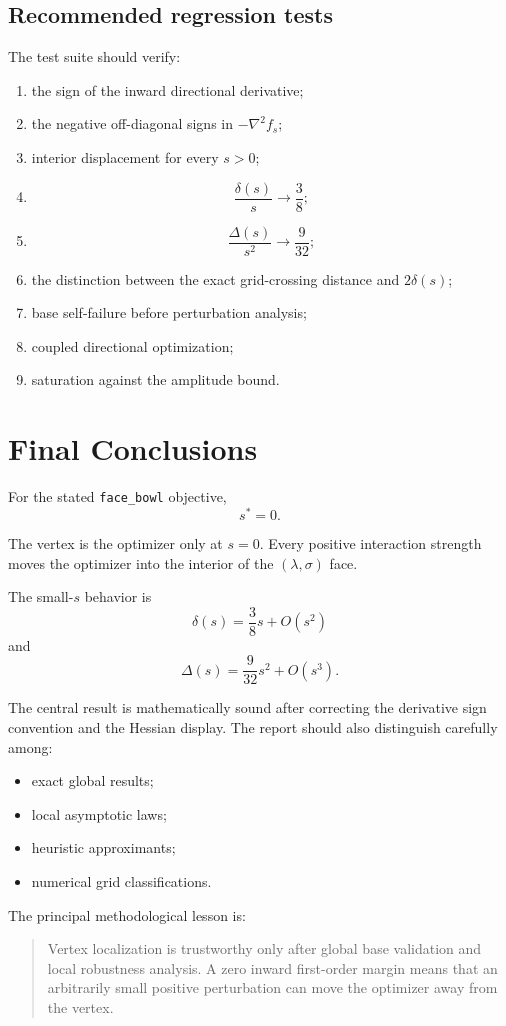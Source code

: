 \documentclass[11pt]{article}
\theoremstyle{remark}
\begin{document}
\subsection{Recommended regression tests}

The test suite should verify:

\begin{enumerate}
    \item the sign of the inward directional derivative;
    \item the negative off-diagonal signs in $-\nabla^2f_s$;
    \item interior displacement for every $s>0$;
    \item
    \[
    \frac{\delta(s)}{s}\longrightarrow\frac38;
    \]
    \item
    \[
    \frac{\Delta(s)}{s^2}\longrightarrow\frac{9}{32};
    \]
    \item the distinction between the exact grid-crossing distance and
    $2\delta(s)$;
    \item base self-failure before perturbation analysis;
    \item coupled directional optimization;
    \item saturation against the amplitude bound.
\end{enumerate}

\section{Final Conclusions}

For the stated \texttt{face\_bowl} objective,
\[
\boxed{s^*=0}.
\]

The vertex is the optimizer only at $s=0$. Every positive interaction strength
moves the optimizer into the interior of the $(\lambda,\sigma)$ face.

The small-$s$ behavior is
\[
\boxed{
\delta(s)=\frac38s+O(s^2)
}
\]
and
\[
\boxed{
\Delta(s)=\frac{9}{32}s^2+O(s^3).
}
\]

The central result is mathematically sound after correcting the derivative
sign convention and the Hessian display. The report should also distinguish
carefully among:

\begin{itemize}
    \item exact global results;
    \item local asymptotic laws;
    \item heuristic approximants;
    \item numerical grid classifications.
\end{itemize}

The principal methodological lesson is:

\begin{quote}
Vertex localization is trustworthy only after global base validation and
local robustness analysis. A zero inward first-order margin means that an
arbitrarily small positive perturbation can move the optimizer away from the
vertex.
\end{quote}
\end{document}
